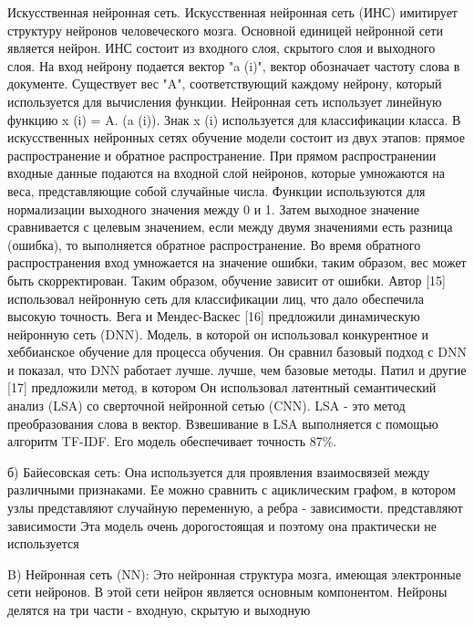 Искусственная нейронная сеть. Искусственная нейронная сеть (ИНС) имитирует
структуру нейронов человеческого мозга. Основной единицей нейронной сети
является нейрон. ИНС состоит из входного слоя, скрытого слоя и выходного слоя.
На вход нейрону подается вектор "a (i)", вектор обозначает частоту слова в
документе. Существует вес "A", соответствующий каждому нейрону, который
используется для вычисления функции.  Нейронная сеть использует линейную функцию
x (i) = A. (a (i)). Знак x (i) используется для классификации класса.  В
искусственных нейронных сетях обучение модели состоит из двух этапов: прямое
распространение и обратное распространение. При прямом распространении входные
данные подаются на входной слой нейронов, которые умножаются на веса,
представляющие собой случайные числа. Функции используются для нормализации
выходного значения между 0 и 1. Затем выходное значение сравнивается с целевым
значением, если между двумя значениями есть разница (ошибка), то выполняется
обратное распространение. Во время обратного распространения вход умножается на
значение ошибки, таким образом, вес может быть скорректирован. Таким образом,
обучение зависит от ошибки. Автор [15] использовал нейронную сеть для
классификации лиц, что дало обеспечила высокую точность.  Вега и Мендес-Васкес
[16] предложили динамическую нейронную сеть (DNN). Модель, в которой он
использовал конкурентное и хеббианское обучение для процесса обучения.  Он
сравнил базовый подход с DNN и показал, что DNN работает лучше. лучше, чем
базовые методы. Патил и другие [17] предложили метод, в котором Он использовал
латентный семантический анализ (LSA) со сверточной нейронной сетью (CNN).  LSA -
это метод преобразования слова в вектор. Взвешивание в LSA выполняется с помощью
алгоритм TF-IDF. Его модель обеспечивает точность 87\%.~\cite{article16}

б) Байесовская сеть: Она используется для проявления взаимосвязей между
различными признаками. Ее можно сравнить с ациклическим графом, в котором узлы
представляют случайную переменную, а ребра - зависимости. представляют
зависимости Эта модель очень дорогостоящая и поэтому она практически не
используется~\cite{article18}


B) Нейронная сеть (NN): Это нейронная структура мозга, имеющая электронные сети
нейронов. В этой сети нейрон является основным компонентом. Нейроны делятся на
три части - входную, скрытую и выходную~\cite{article18}
